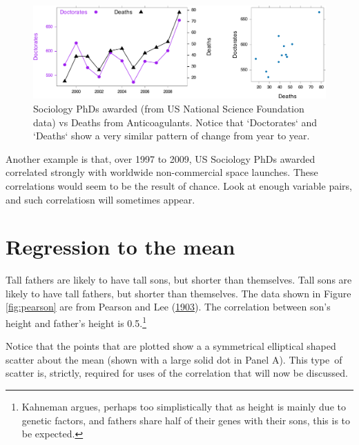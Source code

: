 \documentclass[
  10pt,
  b5paper]{book}
\begin{document}
\begin{figure}

{\centering \includegraphics[width=1\linewidth]{07-regress_files/figure-latex/socAnti-1} 

}

\caption{Sociology PhDs awarded (from US National Science 
Foundation data) vs Deaths from Anticoagulants.  Notice
that `Doctorates` and `Deaths` show a very similar pattern
of change from year to year.}\label{fig:socAnti}
\end{figure}

Another example is that, over 1997 to 2009, US Sociology PhDs awarded correlated strongly with worldwide non-commercial space launches. These correlations would seem to be the result of chance. Look at enough variable pairs, and such correlatiosn will sometimes appear.

\hypertarget{regression-to-the-mean}{%
\section{Regression to the mean}\label{regression-to-the-mean}}

Tall fathers are likely to have tall sons, but shorter than themselves. Tall sons are likely to have tall fathers, but shorter than themselves. The data shown in Figure \ref{fig:pearson} are from Pearson and Lee (\protect\hyperlink{ref-pearson1903laws}{1903}). The correlation between son's height and father's height is 0.5.\footnote{Kahneman argues, perhaps too simplistically that as height is mainly due to genetic factors, and fathers share half of their genes with their sons, this is to be expected.}

Notice that the points that are plotted show a a symmetrical elliptical shaped scatter about the mean (shown with a large solid dot in Panel A). This type~of scatter is, strictly, required for uses of the correlation that will now be discussed.
\end{document}

